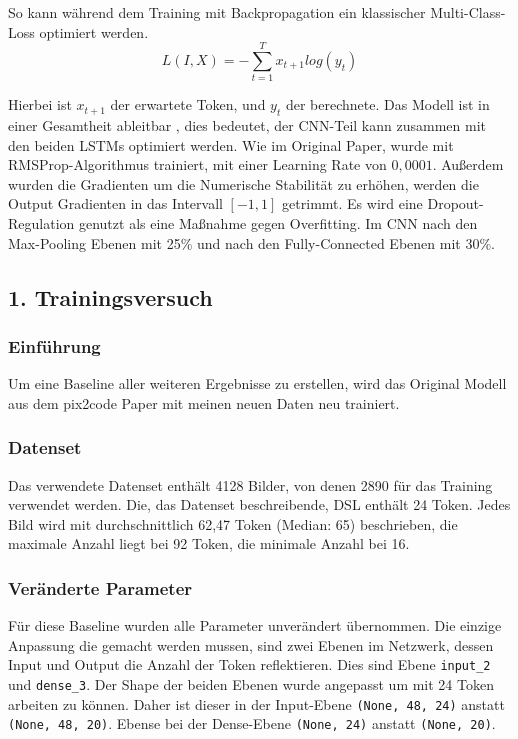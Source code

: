 \documentclass[pdftex,a4paper,halfparskip, article]{scrartcl}
\begin{document}
So kann während dem Training mit Backpropagation ein klassischer Multi-Class-Loss optimiert werden.
\begin{equation}
L(I, X) =  -\sum_{t=1}^T x_{t+1} log(y_t)
\end{equation}

Hierbei ist $x_{t+1}$ der erwartete Token, und $y_t$ der berechnete. Das Modell ist in einer Gesamtheit ableitbar , dies bedeutet, der CNN-Teil kann zusammen mit den beiden LSTMs optimiert werden. Wie im Original Paper, wurde mit RMSProp-Algorithmus trainiert, mit einer Learning Rate von $0,0001$. Außerdem wurden die Gradienten um die Numerische Stabilität zu erhöhen, werden die Output Gradienten in das Intervall $[-1,1]$ getrimmt. Es wird eine Dropout-Regulation genutzt als eine Maßnahme gegen Overfitting. Im CNN nach den Max-Pooling Ebenen mit 25\% und nach den Fully-Connected Ebenen mit 30\%.



\subsection{1. Trainingsversuch}

\subsubsection*{Einführung}

Um eine Baseline aller weiteren Ergebnisse zu erstellen, wird das Original Modell aus dem pix2code Paper mit meinen neuen Daten neu trainiert. 

\subsubsection*{Datenset}

Das verwendete Datenset enthält 4128 Bilder, von denen 2890 für das Training verwendet werden. Die, das Datenset beschreibende, DSL enthält 24 Token. Jedes Bild wird mit durchschnittlich 62,47 Token (Median: 65) beschrieben, die maximale Anzahl liegt bei 92 Token, die minimale Anzahl bei 16. 

\subsubsection*{Veränderte Parameter}

Für diese Baseline wurden alle Parameter unverändert übernommen. Die einzige Anpassung die gemacht werden mussen, sind zwei Ebenen im Netzwerk, dessen Input und Output die Anzahl der Token reflektieren. Dies sind Ebene \texttt{input\_2} und \texttt{dense\_3}. Der Shape der beiden Ebenen wurde angepasst um mit 24 Token arbeiten zu können. Daher ist dieser in der Input-Ebene \texttt{(None, 48, 24)} anstatt \texttt{(None, 48, 20)}. Ebense bei der Dense-Ebene \texttt{(None, 24)} anstatt \texttt{(None, 20)}.
\end{document}

